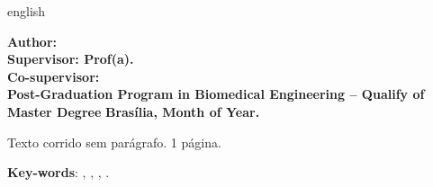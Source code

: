 \begin{resumo}[Abstract]
 \begin{otherlanguage*}{english}

 \begin{center}
\textbf{\imprimirTitle}
\end{center}

\begin{flushleft}
\footnotesize
\textbf{Author: \imprimirautor}\\
\textbf{Supervisor: Prof(a). \imprimirorientador} \\
\textbf{Co-supervisor: \imprimirmembroCoorientador} \\
\textbf{Post-Graduation Program in Biomedical Engineering – Qualify of Master Degree}
\textbf{Brasília, Month of Year.}\newline
\end{flushleft}
 
Texto corrido sem parágrafo. 1 página.

   \vspace{\onelineskip}
 
   \noindent 
   \textbf{Key-words}: 	\imprimirpalavrachaveumingles, \imprimirpalavrachavedoisingles, 
			\imprimirpalavrachavetresingles, \imprimirpalavrachavequatroingles.
 \end{otherlanguage*}
\end{resumo}
